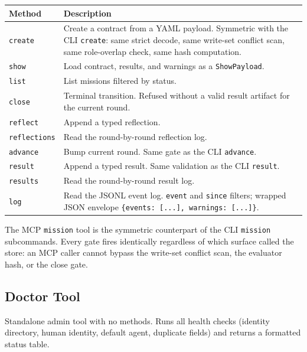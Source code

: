 \documentclass[a4paper,10pt]{article}
\newcommand{\tool}[1]{\texttt{#1}}
\newcommand{\field}[1]{\texttt{#1}}
\newcommand{\cmd}[1]{\texttt{#1}}
\begin{document}
\begin{center}
\begin{tabular}{@{}lp{6.5cm}@{}}
\toprule
\textbf{Method} & \textbf{Description} \\
\midrule
\texttt{create}      & Create a contract from a YAML payload.
                       Symmetric with the CLI \cmd{create}: same
                       strict decode, same write-set conflict scan,
                       same role-overlap check, same hash
                       computation. \\
\texttt{show}        & Load contract, results, and warnings as a
                       \texttt{ShowPayload}. \\
\texttt{list}        & List missions filtered by status. \\
\texttt{close}       & Terminal transition.  Refused without a
                       valid result artifact for the current
                       round. \\
\texttt{reflect}     & Append a typed reflection. \\
\texttt{reflections} & Read the round-by-round reflection log. \\
\texttt{advance}     & Bump current round.  Same gate as the CLI
                       \cmd{advance}. \\
\texttt{result}      & Append a typed result.  Same validation as
                       the CLI \cmd{result}. \\
\texttt{results}     & Read the round-by-round result log. \\
\texttt{log}         & Read the JSONL event log.  \field{event} and
                       \field{since} filters; wrapped JSON envelope
                       \texttt{\{events: [...], warnings: [...]\}}. \\
\bottomrule
\end{tabular}
\end{center}

The MCP \tool{mission} tool is the symmetric counterpart of the CLI
\cmd{mission} subcommands.  Every gate fires identically regardless
of which surface called the store: an MCP caller cannot bypass the
write-set conflict scan, the evaluator hash, or the close gate.

\subsection{Doctor Tool}

Standalone admin tool with no methods.  Runs all health checks
(identity directory, human identity, default agent, duplicate
fields) and returns a formatted status table.
\end{document}
